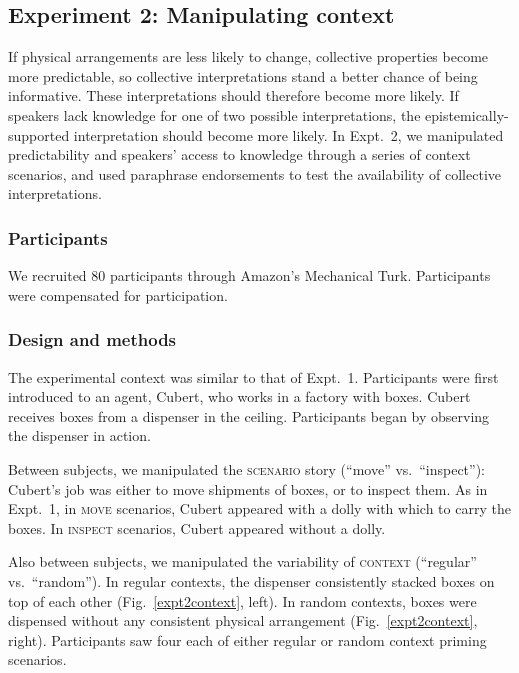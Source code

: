 \documentclass[linguex]{sp}
\begin{document}
\subsection{Experiment 2: Manipulating context}

If physical arrangements are less likely to change, collective properties become more predictable, so collective interpretations stand a better chance of being informative. These interpretations should therefore become more likely. If speakers lack knowledge for one of two possible interpretations, the epistemically-supported interpretation should become more likely. In Expt.~2, we manipulated predictability and speakers' access to knowledge through a series of context scenarios, and used paraphrase endorsements to test the availability of collective interpretations.

\subsubsection{Participants}

We recruited 80 participants through Amazon's Mechanical Turk. Participants were compensated for participation.

\subsubsection{Design and methods}

The experimental context was similar to that of Expt.~1. Participants were first introduced to an agent, Cubert, who works in a factory with boxes. Cubert receives boxes from a dispenser in the ceiling. Participants began by observing the dispenser in action.

Between subjects, we manipulated the \textsc{scenario} story (``move'' vs.~``inspect''): Cubert's job was either to move shipments of boxes, or to inspect them. As in Expt.~1, in \textsc{move} scenarios, Cubert appeared with a dolly with which to carry the boxes. In \textsc{inspect} scenarios, Cubert appeared without a dolly.

Also between subjects, we manipulated the variability of \textsc{context} (``regular'' vs.~``random''). In regular contexts, the dispenser consistently stacked boxes on top of each other (Fig.~\ref{expt2context}, left). In random contexts, boxes were dispensed without any consistent physical arrangement (Fig.\ \ref{expt2context}, right). Participants saw four each of either regular or random context priming scenarios.
\end{document}
